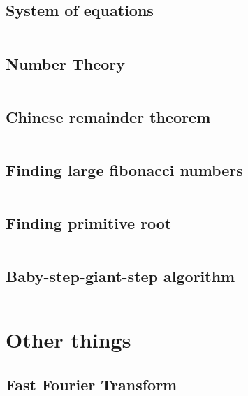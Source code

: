 \documentclass[8pt,a4paper,landscape,oneside]{amsart}
\newcommand{\codec}[1]{\inputminted[fontsize=\large,tabsize=2,baselinestretch=1]{cpp}{code/#1}}
\newcommand{\codep}[1]{\inputminted[fontsize=\large,tabsize=2,baselinestretch=1]{py}{code/#1}}
\begin{document}
\begin{multicols*}{2}
\begin{large}
\subsection{System of equations}
\codep{gaussianelimination.py}
\subsection{Number Theory}
\codep{gcdbezout.py}
\iffalse
\subsection{Primes and Prime factorization}
\codep{primecalc.py}
\fi
\subsection{Chinese remainder theorem}
\codep{crt.py}
\subsection{Finding large fibonacci numbers}
\codep{fibonacci.py}
\subsection{Finding primitive root}
\codep{primitiveroot.py}
\subsection{Baby-step-giant-step algorithm}
\codep{babystepgiantstep.py}
\section{Other things}
\subsection{Fast Fourier Transform}
\codec{fft.cpp}

\end{large}
\end{multicols*}
\end{document}
